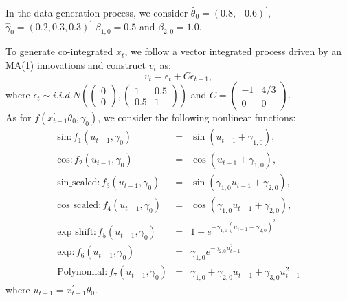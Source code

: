 \documentclass[a4paper,12pt,times,numbered,print,index]{report}
\numberwithin{equation}{section}
\begin{document}
	In the data generation process, we consider $\hat{\theta}_0 = (0.8, -0.6)^{\prime}$, $\hat{\gamma}_0 = (0.2, 0.3, 0.3)^{\prime}$ $\beta_{1,0} = 0.5$ and $\beta_{2,0} = 1.0$.
	
	To generate co-integrated $x_t$, we follow a vector integrated process driven by an MA(1) innovations and construct $v_t$ as:
	$$
	v_t = \epsilon_t + C\epsilon_{t-1},
	$$
	where $\epsilon_{t} \sim i.i.d. N\left(\left(\begin{array}{c}
		0 \\
		0
	\end{array}\right)
	,\left(\begin{array}{cc}1 & 0.5 \\ 0.5 & 1\end{array}\right)\right)$ and $C=\left(\begin{array}{cc} -1  & 4/ 3 \\ 0 & 0\end{array}\right)$. 
	\\
	
	As for $f\left( x_{t-1}^{\prime }\theta _{0},\gamma _{0}\right)$, we consider the following nonlinear functions:
	\begin{eqnarray*}
		\text{sin}: f_{1}\left( u_{t-1},\gamma _{0}\right) &=&\sin \left( u_{t-1}+\gamma_{1,0}\right),  \\
		\text{cos}: f_{2}\left( u_{t-1},\gamma _{0}\right) &=&\cos \left( u_{t-1}+\gamma_{1,0}\right), \\
		\text{sin\_scaled}: f_{3}\left( u_{t-1},\gamma_{0}\right) &=&\sin \left( \gamma_{1,0}u_{t-1}+\gamma_{2,0}\right),  \\
		\text{cos\_scaled}: f_{4}\left( u_{t-1},\gamma_{0}\right) &=&\cos \left( \gamma_{1,0}u_{t-1}+\gamma_{2,0}\right), \\
		\text{exp\_shift}: f_{5}\left( u_{t-1}, \gamma_{0}\right) &=& 1-e^{-\gamma_{1,0}\left(u_{t-1}-\gamma_{2,0}\right)^{2}} \\
		\text{exp}: f_{6}\left( u_{t-1},\gamma _{0}\right) &=& \gamma_{1,0} e^{-\gamma_{2,0}u_{t-1}^2}  \\
		\text{Polynomial}: f_{7}\left( u_{t-1},\gamma_{0}\right) &=&\gamma_{1,0}+ \gamma_{2,0}u_{t-1}+\gamma_{3,0}u_{t-1}^{2}
	\end{eqnarray*}%
	where $u_{t-1} =  x_{t-1}^{\prime }\theta _{0}$.
	
\end{document}
